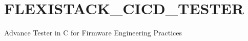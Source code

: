 \chapter{FLEXISTACK\+\_\+\+CICD\+\_\+\+TESTER}
\hypertarget{md_README}{}\label{md_README}
\label{md_README_autotoc_md0}%
%
Advance Tester in C for Firmware Engineering Practices  